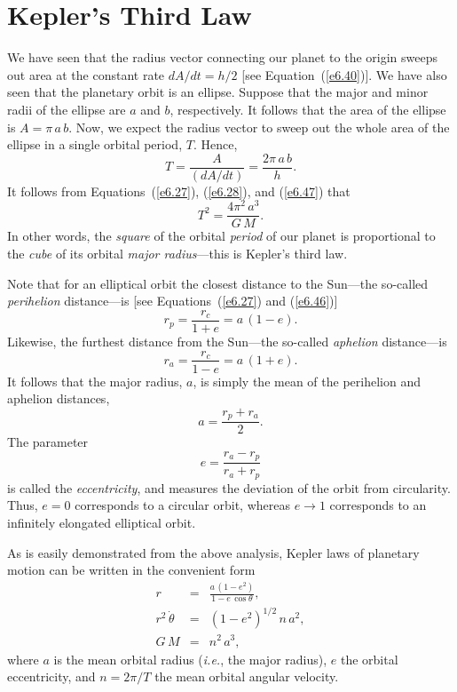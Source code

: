 \section{Kepler's Third Law}
We have seen that the radius vector connecting our planet to the
origin sweeps out area at the constant rate $dA/dt=h/2$ [see Equation~(\ref{e6.40})].
We have also seen that the planetary orbit is an ellipse. Suppose that
the major and minor radii of the ellipse are $a$ and $b$, respectively. It follows that the area of the ellipse is $A=\pi\,a\,b$. Now, we expect the
radius vector to sweep out the whole area of the ellipse in a single
orbital period, $T$. Hence,
\begin{equation}
T = \frac{A}{(dA/dt)} = \frac{2\pi\,a\,b}{h}.
\end{equation}
It follows from Equations~(\ref{e6.27}), (\ref{e6.28}), and (\ref{e6.47})
that
\begin{equation}\label{e6.49}
T^2 = \frac{4\pi^2\,a^3}{G\,M}.
\end{equation}
In other words, the {\em square}\/ of the orbital {\em period}\/ of our planet is proportional to the {\em cube}\/
of its orbital {\em major radius}---this is Kepler's third law.

Note that for an elliptical orbit the closest distance to the Sun---the so-called
{\em perihelion}\/ distance---is [see Equations~(\ref{e6.27}) and (\ref{e6.46})]
\begin{equation}\label{e6.50}
r_p = \frac{r_c}{1+e} = a\,(1-e).
\end{equation}
Likewise, the  furthest distance from the Sun---the so-called {\em aphelion}\/ distance---is
\begin{equation}\label{e6.51}
r_a = \frac{r_c}{1-e} = a\,(1+e).
\end{equation}
It follows that the major radius, $a$, is simply the mean of the perihelion
and aphelion distances,
\begin{equation}
a = \frac{r_p+r_a}{2}.
\end{equation}
The parameter 
\begin{equation}\label{e6.53}
e = \frac{r_a-r_p}{r_a+r_p}
\end{equation}
is called the {\em eccentricity}, and measures the deviation of the orbit
from circularity. Thus, $e=0$ corresponds to a circular orbit, whereas
$e\rightarrow 1$ corresponds to an infinitely elongated elliptical orbit.

As is easily demonstrated from the above analysis, Kepler laws of planetary motion can be written in the convenient form
\begin{eqnarray}
r &=& \frac{a\,(1-e^2)}{1-e\,\cos\theta},\\[0.5ex]
r^2\,\dot{\theta} &=& (1-e^2)^{1/2}\,n\,a^2,\\[0.5ex]
G\,M &=& n^2\,a^3,
\end{eqnarray}
where $a$ is the mean orbital radius ({\em i.e.}, the major radius), $e$ the orbital eccentricity, and
$n=2\pi/T$  the mean orbital angular velocity.

